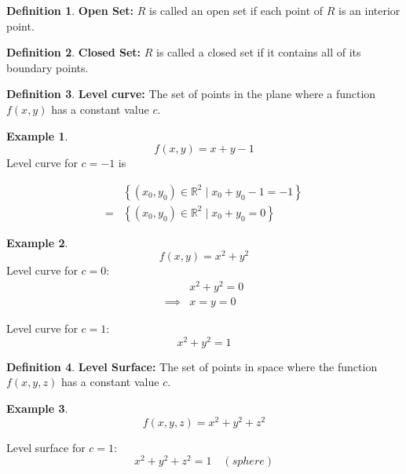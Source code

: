\documentclass[12pt]{article}
\theoremstyle{definition}
\newtheorem*{example}{Example}
\theoremstyle{definition}
\newtheorem*{defn}{Definition}
\begin{document}
\begin{defn}
	\textbf{Open Set:} $R$ is called an open set if each point of $R$ is an interior point.
\end{defn}

\begin{defn}
	\textbf{Closed Set:} $R$ is called a closed set if it contains all of its boundary points.
\end{defn}

\begin{defn}
	\textbf{Level curve:} The set of points in the plane where a function $f(x, y)$ has a constant value $c$.
\end{defn}

\begin{example}
	\begin{equation*}
		f(x, y) = x + y - 1
	\end{equation*} 
	Level curve for $c = -1$ is 

	\begin{align*}
		&\left\{ (x_0, y_0) \in \mathbb{R}^2 \mid x_0 + y_0 -1 = -1 \right\}\\
		= & \left\{ (x_0, y_0) \in \mathbb{R}^2 \mid x_0 + y_0 = 0 \right\}
	\end{align*}
\end{example}

\begin{example}
	\begin{equation*}
		f(x, y) = x^2 + y^2
	\end{equation*}
	Level curve for $c = 0$:
	\begin{align*}
		&x^2 + y^2 = 0 \\
		\implies &x = y = 0
	\end{align*}

	Level curve for $c = 1$:
	\begin{equation*}
		x^2 + y^2 = 1
	\end{equation*}
\end{example}

\begin{defn}
	\textbf{Level Surface:} The set of points in space where the function $f(x, y, z)$ has a constant value $c$.
\end{defn}

\begin{example}
	\begin{equation*}
		f(x, y, z) = x^2 + y^2 + z^2
	\end{equation*}

	Level surface for $c = 1$:
	\begin{equation*}
		x^2 + y^2 + z^2 = 1 \quad (sphere)
	\end{equation*}
\end{example}
\end{document}
